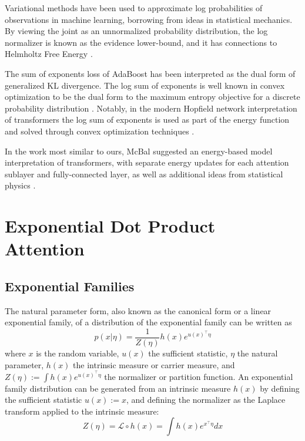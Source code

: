 \documentclass{article}
\begin{document}
Variational methods have been used to approximate log probabilities of observations in machine learning, borrowing from ideas in statistical mechanics. By viewing the joint as an unnormalized probability distribution, the log normalizer is known as the evidence lower-bound, and it has connections to Helmholtz Free Energy \cite{Hinton:1995,koller2009probabilistic}.

The sum of exponents loss of AdaBoost \cite{collins00logistic} has been interpreted as the dual form of generalized KL divergence. The log sum of exponents is well known in convex optimization to be the dual form to the maximum entropy objective for a discrete probability distribution \cite{citeulike:163662}. Notably, in the modern Hopfield network interpretation of transformers the log sum of exponents is used as part of the energy function and solved through convex optimization techniques \cite{DBLP:journals/corr/abs-2008-02217}.

In the work most similar to ours, McBal suggested an energy-based model interpretation of transformers, with separate energy updates for each attention sublayer and fully-connected layer, as well as additional ideas from statistical physics \cite{bal_2020}.

\section{Exponential Dot Product Attention}
\label{exponential dot product attention}

\subsection{Exponential Families}
\label{exponential families}
The natural parameter form, also known as the canonical form or a linear exponential family, of a distribution of the exponential family can be written as
\begin{equation}
  p(x \vert \eta) = 
    \frac{1}{Z \left( \eta \right) }
    h(x)
    e^{ u(x)^\intercal \eta}
  \label{exponential family}
\end{equation}
where $x$ is the random variable, 
$u(x)$ the sufficient statistic, 
$\eta$ the natural parameter, 
$h(x)$ the intrinsic measure or carrier measure, 
and 
$Z ( \eta ) := \int h(x) e^{ u(x)^\intercal \eta }$ the normalizer or partition function.
An exponential family distribution can be generated from an intrinsic measure $h(x)$ by defining the sufficient statistic $u(x) := x$, and defining the normalizer as the Laplace transform applied to the intrinsic measure:
\begin{equation}
  Z ( \eta ) = \mathcal{L} \circ h(x) = \int h(x) e^{ x^\intercal \eta} dx
  \label{Laplace transform}
\end{equation}
\end{document}
